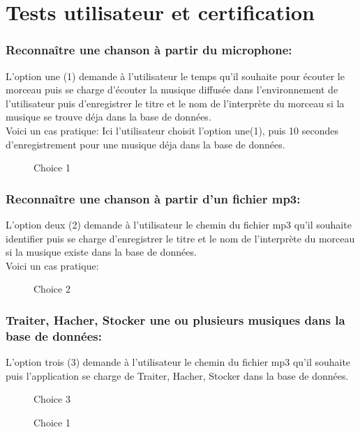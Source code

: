 \documentclass[11pt, report, french]{scrreprt}
\begin{document}
\section{Tests utilisateur et certification}
\subsubsection{Reconnaître une chanson à partir du microphone:}
L'option une (1) demande à l'utilisateur le temps qu'il souhaite pour écouter le morceau puis se charge d'écouter la musique diffusée dans l'environnement de l'utilisateur puis d'enregistrer le titre et le nom de l'interprète du morceau si la musique se trouve déja dans la base de données.\\
Voici un cas pratique:
Ici l'utilisateur choisit l'option une(1), puis 10 secondes d'enregistrement pour une musique déja dans la base de données.
\begin{figure}[H]
	\centering
	\caption{Choice 1}
\end{figure}
\subsubsection{Reconnaître une chanson à partir d’un fichier mp3:}
L'option deux (2) demande à l'utilisateur le chemin du fichier mp3 qu'il souhaite identifier puis se charge d'enregistrer le titre et le nom de l'interprète du morceau si la musique existe dans la base de données.\\
Voici un cas pratique:
\begin{figure}[H]
	\centering
	\caption{Choice 2}
\end{figure}
\subsubsection{Traiter, Hacher, Stocker une ou plusieurs musiques dans la base de données:}
L'option trois (3) demande à l'utilisateur le chemin du fichier mp3 qu'il souhaite puis l'application se charge de Traiter, Hacher, Stocker dans la base de données.

\begin{figure}[H]
	\centering
	\caption{Choice 3}
\end{figure}

\begin{figure}[H]
	\centering
	\caption{Choice 1}
\end{figure}
\end{document}
